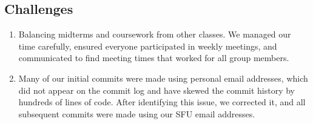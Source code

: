 \documentclass[12pt]{article}
\begin{document}
\subsection{Challenges}
\renewcommand{\labelenumi}{\textbf{\arabic{enumi}.}}
\begin{enumerate}
\item Balancing midterms and coursework from other classes. We managed our time carefully, ensured everyone participated in weekly meetings, and communicated to find meeting times that worked for all group members.

\item Many of our initial commits were made using personal email addresses, which did not appear on the commit log and have skewed the commit history by hundreds of lines of code. After identifying this issue, we corrected it, and all subsequent commits were made using our SFU email addresses.
\end{enumerate}

\end{document}
